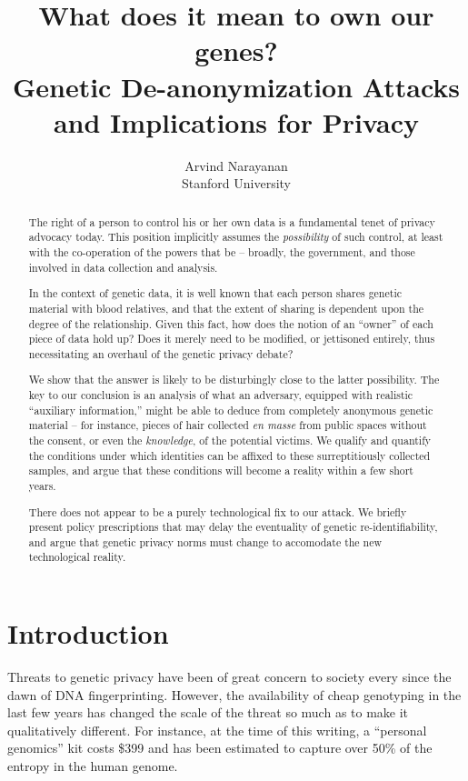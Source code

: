 \documentclass{article}
\title{What does it mean to own our genes?\\
{\small Genetic De-anonymization Attacks and Implications for Privacy}}
\author{Arvind Narayanan \\
{\small Stanford University}}
\begin{document}
\maketitle




\begin{abstract}
The right of a person to control his or her own data is a fundamental tenet of privacy advocacy today. This position implicitly assumes the {\em possibility} of such control, at least with the co-operation of the powers that be -- broadly, the government, and those involved in data collection and analysis.

In the context of genetic data, it is well known that each person shares genetic material with blood relatives, and that the extent of sharing is dependent upon the degree of the relationship. Given this fact, how does the notion of an ``owner'' of each piece of data hold up? Does it merely need to be modified, or jettisoned entirely, thus necessitating an overhaul of the genetic privacy debate?

We show that the answer is likely to be disturbingly close to the latter possibility. The key to our conclusion is an analysis of what an adversary, equipped with realistic ``auxiliary information,'' might be able to deduce from completely anonymous genetic material -- for instance, pieces of hair collected {\em en masse} from public spaces without the consent, or even the {\em knowledge}, of the potential victims. We qualify and quantify the conditions under which identities can be affixed to these surreptitiously collected samples, and argue that these conditions will become a reality within a few short years.

There does not appear to be a purely technological fix to our attack. We briefly present policy prescriptions that may delay the eventuality of genetic re-identifiability, and argue that genetic privacy norms must change to accomodate the new technological reality.
\end{abstract}

\section{Introduction}

Threats to genetic privacy have been of great concern to society every since the dawn of DNA fingerprinting. However, the availability of cheap genotyping in the last few years has changed the scale of the threat so much as to make it qualitatively different. For instance, at the time of this writing, a ``personal genomics'' kit costs \$399 \cite{23-and-me} and has been estimated to capture over 50\% of the entropy in the human genome.
\end{document}
